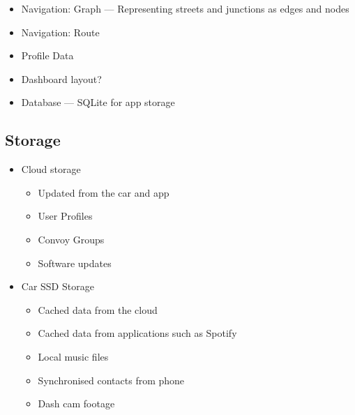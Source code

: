 \documentclass{article}
\begin{document}
  \begin{itemize}
      \item Navigation: Graph --- Representing streets and junctions as edges and nodes
      \item Navigation: Route
	  \item Profile Data
      \item Dashboard layout?
      \item Database --- SQLite for app storage    
  \end{itemize}

\subsection{Storage} \label{ssec:storage}
  \begin{itemize}
      \item Cloud storage%
          \begin{itemize}
          	  \item Updated from the car and app
              \item User Profiles
              \item Convoy Groups
              \item Software updates
          \end{itemize}
      \item Car SSD Storage
      \begin{itemize}
      		\item Cached data from the cloud
            \item Cached data from applications such as Spotify
            \item Local music files
            \item Synchronised contacts from phone
            \item Dash cam footage
      \end{itemize}
  \end{itemize}
  
\end{document}
